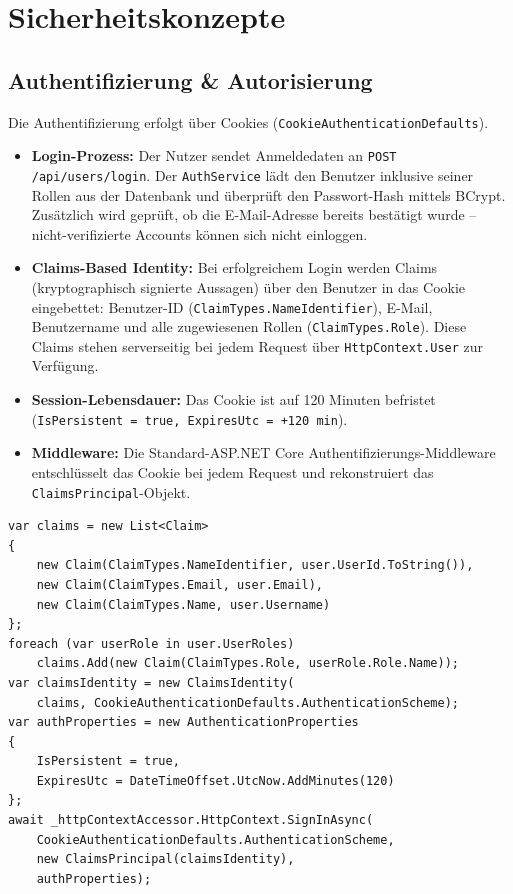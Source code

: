 \newpage
\section{Sicherheitskonzepte}

\subsection{Authentifizierung \& Autorisierung}
Die Authentifizierung erfolgt über Cookies (\texttt{CookieAuthenticationDefaults}).
\begin{itemize}
    \item \textbf{Login-Prozess:} Der Nutzer sendet Anmeldedaten an \texttt{POST /api/users/login}. Der \texttt{AuthService} lädt den Benutzer inklusive seiner Rollen aus der Datenbank und überprüft den Passwort-Hash mittels BCrypt. Zusätzlich wird geprüft, ob die E-Mail-Adresse bereits bestätigt wurde -- nicht-verifizierte Accounts können sich nicht einloggen.
    \item \textbf{Claims-Based Identity:} Bei erfolgreichem Login werden Claims (kryptographisch signierte Aussagen) über den Benutzer in das Cookie eingebettet: Benutzer-ID (\texttt{ClaimTypes.NameIdentifier}), E-Mail, Benutzername und alle zugewiesenen Rollen (\texttt{ClaimTypes.Role}). Diese Claims stehen serverseitig bei jedem Request über \texttt{HttpContext.User} zur Verfügung.
    \item \textbf{Session-Lebensdauer:} Das Cookie ist auf 120 Minuten befristet (\texttt{IsPersistent = true, ExpiresUtc = +120 min}).
    \item \textbf{Middleware:} Die Standard-ASP.NET Core Authentifizierungs-Middleware entschlüsselt das Cookie bei jedem Request und rekonstruiert das \texttt{ClaimsPrincipal}-Objekt.
\end{itemize}

\begin{lstlisting}[language={[Sharp]C}, caption={Claims-Aufbau beim Login in AuthService.cs}]
var claims = new List<Claim>
{
    new Claim(ClaimTypes.NameIdentifier, user.UserId.ToString()),
    new Claim(ClaimTypes.Email, user.Email),
    new Claim(ClaimTypes.Name, user.Username)
};
foreach (var userRole in user.UserRoles)
    claims.Add(new Claim(ClaimTypes.Role, userRole.Role.Name));
var claimsIdentity = new ClaimsIdentity(
    claims, CookieAuthenticationDefaults.AuthenticationScheme);
var authProperties = new AuthenticationProperties
{
    IsPersistent = true,
    ExpiresUtc = DateTimeOffset.UtcNow.AddMinutes(120)
};
await _httpContextAccessor.HttpContext.SignInAsync(
    CookieAuthenticationDefaults.AuthenticationScheme,
    new ClaimsPrincipal(claimsIdentity),
    authProperties);
\end{lstlisting}

